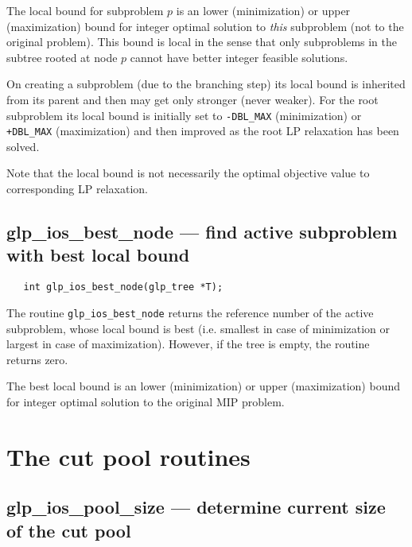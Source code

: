 \newpage


The local bound for subproblem $p$ is an lower (minimization) or upper
(maximization) bound for integer optimal solution to {\it this}
subproblem (not to the original problem). This bound is local in the
sense that only subproblems in the subtree rooted at node $p$ cannot
have better integer feasible solutions.

On creating a subproblem (due to the branching step) its local bound is
inherited from its parent and then may get only stronger (never weaker).
For the root subproblem its local bound is initially set to
\verb|-DBL_MAX| (minimization) or \verb|+DBL_MAX| (maximization) and
then improved as the root LP relaxation has been solved.

Note that the local bound is not necessarily the optimal objective
value to corresponding LP relaxation.

\subsection{glp\_ios\_best\_node --- find active subproblem with best
local bound}

\synopsis

\begin{verbatim}
   int glp_ios_best_node(glp_tree *T);
\end{verbatim}

\returns

The routine \verb|glp_ios_best_node| returns the reference number of
the active subproblem, whose local bound is best (i.e. smallest in case
of minimization or largest in case of maximization). However, if the
tree is empty, the routine returns zero.


The best local bound is an lower (minimization) or upper (maximization)
bound for integer optimal solution to the original MIP problem.


\newpage

\section{The cut pool routines}

\subsection{glp\_ios\_pool\_size --- determine current size of the cut
pool}


